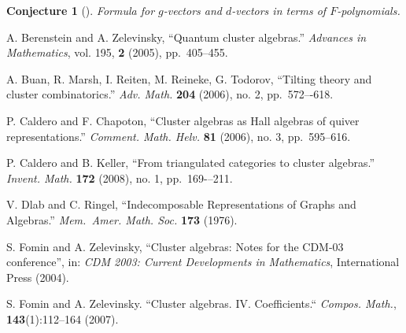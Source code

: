 \documentclass{amsart}
\newtheorem{conjecture}[theorem]{Conjecture}
\begin{document}
\begin{conjecture}[{\cite[Conjectures 6.11 and 7.17]{FZ07}}]
  Formula for $g$-vectors and $d$-vectors in terms of $F$-polynomials.
\end{conjecture}


  \begin{thebibliography}{99}


  A. Berenstein and A. Zelevinsky, ``Quantum cluster algebras.''   {\em Advances in Mathematics}, vol. 195, {\bf 2} (2005), pp.~405--455.

  A. Buan, R. Marsh, I. Reiten, M. Reineke, G. Todorov, ``Tilting theory and cluster combinatorics.'' {\em Adv. Math.} \textbf{204} (2006), no. 2, pp.~572–-618.

  P. Caldero and F. Chapoton, ``Cluster algebras as Hall algebras of quiver representations.'' {\em Comment. Math. Helv.} \textbf{81} (2006), no. 3, pp.~595--616.


  P. Caldero and B. Keller, ``From triangulated categories to cluster algebras.''  {\em Invent. Math.} \textbf{172} (2008), no. 1, pp.~169-–211.





  V. Dlab and C. Ringel, ``Indecomposable Representations of Graphs and Algebras.'' {\em Mem.~Amer. Math. Soc.} \textbf{173} (1976).

   S. Fomin and A. Zelevinsky, ``Cluster algebras: Notes for the CDM-03 conference'', in: {\em CDM 2003: Current Developments in Mathematics}, International Press (2004).

   S. Fomin and A. Zelevinsky. ``Cluster algebras. IV. Coefficients.`` {\em Compos. Math.}, \textbf{143}(1):112–164 (2007).






\end{thebibliography}
\end{document}
